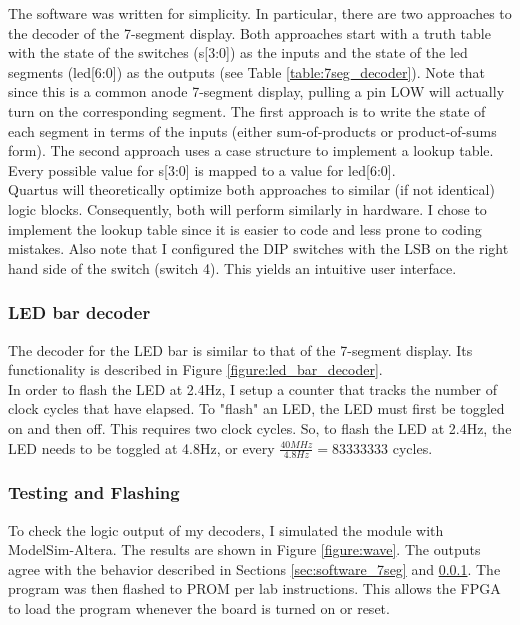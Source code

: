 \documentclass[11pt]{article}
\begin{document}
The software was written for simplicity. In particular, there are two approaches to the decoder of the 7-segment display. Both approaches start with a truth table with the state of the switches (s[3:0]) as the inputs and the state of the led segments (led[6:0]) as the outputs (see Table \ref{table:7seg_decoder}). Note that since this is a common anode 7-segment display, pulling a pin LOW will actually turn on the corresponding segment. The first approach is to write the state of each segment in terms of the inputs (either sum-of-products or product-of-sums form). The second approach uses a case structure to implement a lookup table. Every possible value for s[3:0] is mapped to a value for led[6:0]. \\

Quartus will theoretically optimize both approaches to similar (if not identical) logic blocks. Consequently, both will perform similarly in hardware. I chose to implement the lookup table since it is easier to code and less prone to coding mistakes. Also note that I configured the DIP switches with the LSB on the right hand side of the switch (switch 4). This yields an intuitive user interface. 


\subsubsection{LED bar decoder}
\label{sec:software_LEDbar}

The decoder for the LED bar is similar to that of the 7-segment display. Its functionality is described in Figure \ref{figure:led_bar_decoder}. \\

In order to flash the LED at 2.4Hz, I setup a counter that tracks the number of clock cycles that have elapsed. To "flash" an LED, the LED must first be toggled on and then off. This requires two clock cycles. So, to flash the LED at 2.4Hz, the LED needs to be toggled at 4.8Hz, or every $\frac{40MHz}{4.8Hz} = 83333333$ cycles. \\


\subsubsection{Testing and Flashing}

To check the logic output of my decoders, I simulated the module with ModelSim-Altera. The results are shown in Figure \ref{figure:wave}. The outputs agree with the behavior described in Sections \ref{sec:software_7seg} and \ref{sec:software_LEDbar}. The program was then flashed to PROM per lab instructions. This allows the FPGA to load the program whenever the board is turned on or reset. \\
\end{document}
